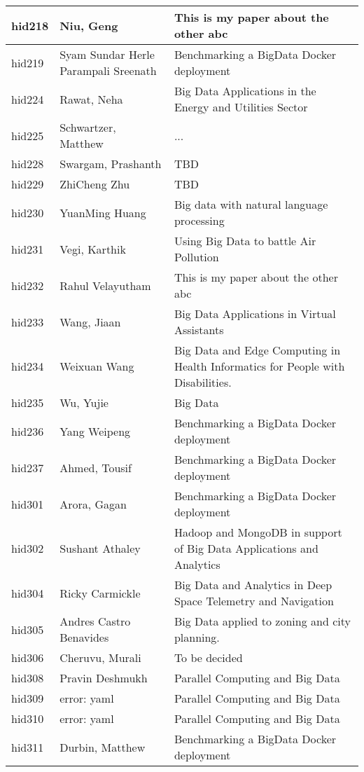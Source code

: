 \documentclass[12pt]{book}
\begin{document}
\begin{footnotesize}
\begin{longtable}{|p{1cm}p{5cm}p{9cm}|}
\hline
hid218 & Niu, Geng & This is my paper about the other abc  \\
\hline
hid219 & Syam Sundar Herle Parampali Sreenath & Benchmarking a BigData Docker deployment  \\
\hline
hid224 & Rawat, Neha & Big Data Applications in the Energy and Utilities Sector  \\
\hline
hid225 & Schwartzer, Matthew & ...  \\
\hline
hid228 & Swargam, Prashanth & TBD  \\
\hline
hid229 & ZhiCheng Zhu & TBD  \\
\hline
hid230 & YuanMing Huang & Big data with natural language processing  \\
\hline
hid231 & Vegi, Karthik & Using Big Data to battle Air Pollution  \\
\hline
hid232 & Rahul Velayutham & This is my paper about the other abc  \\
\hline
hid233 & Wang, Jiaan & Big Data Applications in Virtual Assistants  \\
\hline
hid234 & Weixuan Wang & Big Data and Edge Computing in Health Informatics for People with Disabilities.  \\
\hline
hid235 & Wu, Yujie & Big Data  \\
\hline
hid236 & Yang Weipeng & Benchmarking a BigData Docker deployment  \\
\hline
hid237 & Ahmed, Tousif & Benchmarking a BigData Docker deployment  \\
\hline
hid301 & Arora, Gagan & Benchmarking a BigData Docker deployment  \\
\hline
hid302 & Sushant Athaley & Hadoop and MongoDB in support of Big Data Applications and Analytics  \\
\hline
hid304 & Ricky Carmickle & Big Data and Analytics in Deep Space Telemetry and Navigation  \\
\hline
hid305 & Andres Castro Benavides & Big Data applied to zoning and city planning.  \\
\hline
hid306 & Cheruvu, Murali & To be decided  \\
\hline
hid308 & Pravin Deshmukh & Parallel Computing and Big Data  \\
\hline
hid309 & error: yaml & Parallel Computing and Big Data  \\
\hline
hid310 & error: yaml & Parallel Computing and Big Data  \\
\hline
hid311 & Durbin, Matthew & Benchmarking a BigData Docker deployment  \\

\end{longtable}
\end{footnotesize}
\end{document}

